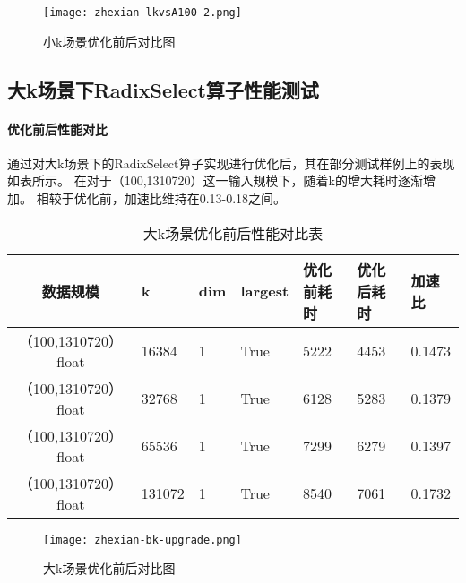     \begin{figure}[ht]
        \centering
        \texttt{[image: zhexian-lkvsA100-2.png]}
        \caption{小k场景优化前后对比图}
        \label{fig:bench_littlek_vsa100_2_zhexian}
    \end{figure}
    


\subsection{大k场景下RadixSelect算子性能测试}

\paragraph{优化前后性能对比}
通过对大k场景下的RadixSelect算子实现进行优化后，其在部分测试样例上的表现如表所示。
在对于（100,1310720）这一输入规模下，随着k的增大耗时逐渐增加。
相较于优化前，加速比维持在0.13-0.18之间。
\begin{table}
    \centering
    \caption{大k场景优化前后性能对比表}
    \label{tab:bench_bigk_upgrade}
    \begin{tabular}{cllllll}
        \toprule
        数据规模       &k  & dim  & largest & 优化前耗时    & 优化后耗时 &加速比\\
        \midrule
        （100,1310720） float&16384&  1     & True      & 5222 & 4453 & 0.1473\\
        （100,1310720） float&32768&  1     & True      & 6128 & 5283 & 0.1379\\
        （100,1310720） float&65536&  1     & True      & 7299 & 6279 & 0.1397\\
        （100,1310720） float&131072&  1     & True      & 8540 & 7061 & 0.1732\\
        \bottomrule
    \end{tabular}
    \end{table}
    
    
    \begin{figure}[ht]
        \centering
        \texttt{[image: zhexian-bk-upgrade.png]}
        \caption{大k场景优化前后对比图}
        \label{fig:bench_bk_upgrade_zhexian}
    \end{figure}
    



